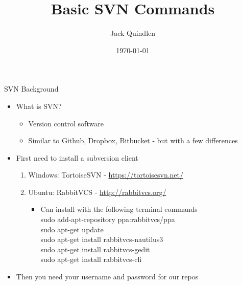 \documentclass[11pt,mathserif]{beamer} %
\title[SVN Slides]{Basic SVN Commands} %
\author[J. Quindlen]{Jack Quindlen \inst{1}} %
\institute[ACL,MIT]	{\inst{1} Aerospace Controls Laboratory, MIT } %
\date{\today} %
\begin{document}

\frame{\titlepage} %

\begin{frame}[t]{SVN Background}
	\begin{itemize} 
		\item What is SVN?
		\begin{itemize}
			\item Version control software
			\item Similar to Github, Dropbox, Bitbucket - but with a few differences
		\end{itemize}
\vspace{0.2in}
		\item First need to install a subversion client
		\begin{enumerate}
			\item Windows: TortoiseSVN - \url{https://tortoisesvn.net/}
			\item Ubuntu: RabbitVCS - \url{http://rabbitvcs.org/}
			\begin{itemize}
				\item Can install with the following terminal commands \\
				sudo add-apt-repository ppa:rabbitvcs/ppa \\
				sudo apt-get update \\
				sudo apt-get install rabbitvcs-nautilus3 \\
				sudo apt-get install rabbitvcs-gedit \\
				sudo apt-get install rabbitvcs-cli
			\end{itemize}
		\end{enumerate}
\vspace{0.2in}
		\item Then you need your username and password for our repos
	\end{itemize}
\end{frame}
\end{document}
